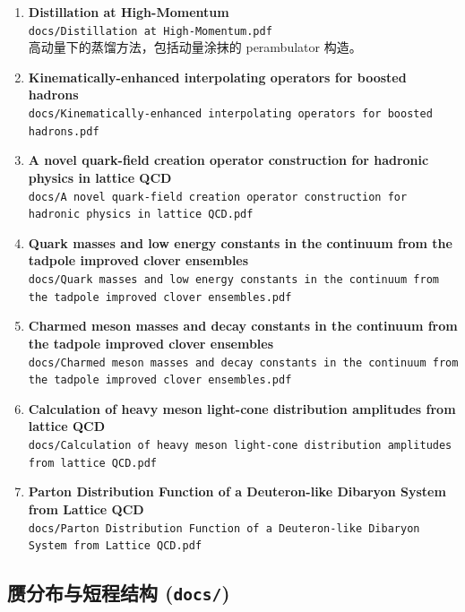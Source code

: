 \documentclass[12pt,a4paper]{ctexart}
\begin{document}
\begin{enumerate}
    \item \textbf{Distillation at High-Momentum} \\
    \texttt{docs/Distillation at High-Momentum.pdf} \\
    高动量下的蒸馏方法，包括动量涂抹的 perambulator 构造。

    \item \textbf{Kinematically-enhanced interpolating operators for boosted hadrons} \\
    \texttt{docs/Kinematically-enhanced interpolating operators for boosted hadrons.pdf}

    \item \textbf{A novel quark-field creation operator construction for hadronic physics in lattice QCD} \\
    \texttt{docs/A novel quark-field creation operator construction for hadronic physics in lattice QCD.pdf}

    \item \textbf{Quark masses and low energy constants in the continuum from the tadpole improved clover ensembles} \\
    \texttt{docs/Quark masses and low energy constants in the continuum from the tadpole improved clover ensembles.pdf}

    \item \textbf{Charmed meson masses and decay constants in the continuum from the tadpole improved clover ensembles} \\
    \texttt{docs/Charmed meson masses and decay constants in the continuum from the tadpole improved clover ensembles.pdf}

    \item \textbf{Calculation of heavy meson light-cone distribution amplitudes from lattice QCD} \\
    \texttt{docs/Calculation of heavy meson light-cone distribution amplitudes from lattice QCD.pdf}

    \item \textbf{Parton Distribution Function of a Deuteron-like Dibaryon System from Lattice QCD} \\
    \texttt{docs/Parton Distribution Function of a Deuteron-like Dibaryon System from Lattice QCD.pdf}
\end{enumerate}

\subsection{赝分布与短程结构 (\texttt{docs/})}
\end{document}
